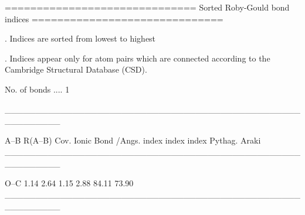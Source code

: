 
==============================
Sorted Roby-Gould bond indices
==============================

. Indices are sorted from lowest to highest

. Indices appear only for atom pairs which are connected
  according to the Cambridge Structural Database (CSD).

No. of bonds .... 1

_________________________________________________________

  A--B    R(A--B)    Cov.   Ionic   Bond    %
           /Angs.   index   index  index  Pythag.   Araki
_________________________________________________________

  O--C       1.14    2.64    1.15   2.88    84.11   73.90
_________________________________________________________
